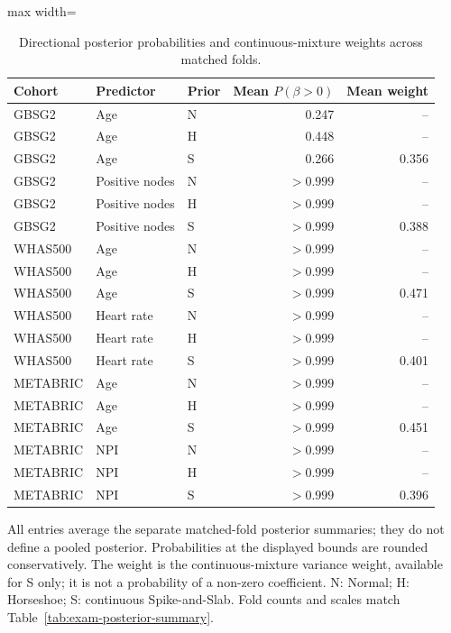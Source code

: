\begin{table}[htbp]
\centering
\begingroup\singlespacing\footnotesize
\setlength{\tabcolsep}{3pt}
\caption{Directional posterior probabilities and continuous-mixture weights across matched folds.}\label{tab:exam-posterior-direction}
\begin{adjustbox}{max width=\textwidth}
\begin{tabular}{@{}lllrr@{}}
\toprule Cohort & Predictor & Prior & Mean $P(\beta>0)$ & Mean weight\\\midrule
GBSG2 & Age & N & 0.247 & --\\
GBSG2 & Age & H & 0.448 & --\\
GBSG2 & Age & S & 0.266 & 0.356\\
GBSG2 & Positive nodes & N & $>0.999$ & --\\
GBSG2 & Positive nodes & H & $>0.999$ & --\\
GBSG2 & Positive nodes & S & $>0.999$ & 0.388\\
WHAS500 & Age & N & $>0.999$ & --\\
WHAS500 & Age & H & $>0.999$ & --\\
WHAS500 & Age & S & $>0.999$ & 0.471\\
WHAS500 & Heart rate & N & $>0.999$ & --\\
WHAS500 & Heart rate & H & $>0.999$ & --\\
WHAS500 & Heart rate & S & $>0.999$ & 0.401\\
METABRIC & Age & N & $>0.999$ & --\\
METABRIC & Age & H & $>0.999$ & --\\
METABRIC & Age & S & $>0.999$ & 0.451\\
METABRIC & NPI & N & $>0.999$ & --\\
METABRIC & NPI & H & $>0.999$ & --\\
METABRIC & NPI & S & $>0.999$ & 0.396\\
\bottomrule
\end{tabular}
\end{adjustbox}
\par\smallskip
\begin{minipage}{\textwidth}
All entries average the separate matched-fold posterior summaries; they do not define a pooled posterior. Probabilities at the displayed bounds are rounded conservatively. The weight is the continuous-mixture variance weight, available for S only; it is not a probability of a non-zero coefficient. N: Normal; H: Horseshoe; S: continuous Spike-and-Slab. Fold counts and scales match Table~\ref{tab:exam-posterior-summary}.
\end{minipage}
\endgroup
\end{table}
